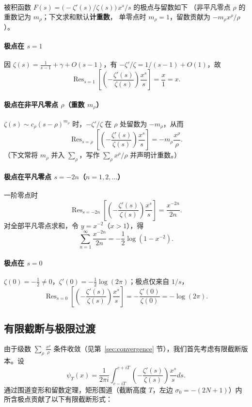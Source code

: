 被积函数 $F(s)=\bigl(-\zeta'(s)/\zeta(s)\bigr)\,x^s/s$ 的极点与留数如下
（非平凡零点 $\rho$ 的重数记为 $m_\rho$；下文求和默认\textbf{计重数}，
单零点时 $m_\rho=1$，留数贡献为 $-m_\rho x^\rho/\rho$）。

\paragraph{极点在 $s=1$}
因 $\zeta(s)=\frac{1}{s-1}+\gamma+O(s-1)$，有 $-\zeta'/\zeta=1/(s-1)+O(1)$，故
\[
\operatorname{Res}_{s=1}\!\left[\left(-\frac{\zeta'(s)}{\zeta(s)}\right)\frac{x^s}{s}\right]
=\frac{x}{1}=x.
\]

\paragraph{极点在非平凡零点 $\rho$（重数 $m_\rho$）}
$\zeta(s)\sim c_\rho(s-\rho)^{m_\rho}$ 时，$-\zeta'/\zeta$ 在 $\rho$ 处留数为 $-m_\rho$，从而
\[
\operatorname{Res}_{s=\rho}\!\left[\left(-\frac{\zeta'(s)}{\zeta(s)}\right)\frac{x^s}{s}\right]
= -m_\rho\frac{x^{\rho}}{\rho}.
\]
（下文常将 $m_\rho$ 并入 $\sum_\rho$，写作 $\sum_\rho x^\rho/\rho$ 并声明计重数。）

\paragraph{极点在平凡零点 $s=-2n$（$n=1,2,\ldots$）}
一阶零点时
\[
\operatorname{Res}_{s=-2n}\!\left[\left(-\frac{\zeta'(s)}{\zeta(s)}\right)\frac{x^s}{s}\right]
=\frac{x^{-2n}}{2n}.
\]
对全部平凡零点求和，令 $y=x^{-2}$（$x>1$），得
\[
\sum_{n=1}^{\infty}\frac{x^{-2n}}{2n}
=-\frac12\log(1-x^{-2}).
\]

\paragraph{极点在 $s=0$}
$\zeta(0)=-\frac12\neq 0$，$\zeta'(0)=-\frac12\log(2\pi)$；极点仅来自 $1/s$，
\[
\operatorname{Res}_{s=0}\!\left[\left(-\frac{\zeta'(s)}{\zeta(s)}\right)\frac{x^s}{s}\right]
=-\frac{\zeta'(0)}{\zeta(0)}=-\log(2\pi).
\]

\subsection{有限截断与极限过渡}


由于级数 $\sum_{\rho} \frac{x^{\rho}}{\rho}$ 条件收敛（见第~\ref{sec:convergence} 节），我们首先考虑有限截断版本。设
\[
\psi_T(x) = \frac{1}{2\pi i} \int_{c-iT}^{c+iT} \left(-\frac{\zeta'(s)}{\zeta(s)}\right) \frac{x^s}{s} ds.
\]
通过围道变形和留数定理，矩形围道（截断高度 $T$，左边 $\sigma_0=-(2N+1)$）内所含极点贡献了以下有限截断形式：

